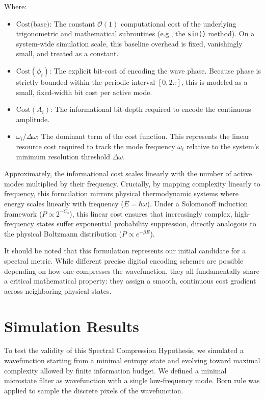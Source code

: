Where:
\begin{itemize}
    \item \textbf{$\text{Cost(base)}$}: The constant $\mathcal{O}(1)$ computational cost of the underlying trigonometric and mathematical subroutines (e.g., the \texttt{sin()} method). 
    On a system-wide simulation scale, this baseline overhead is fixed, vanishingly small, and treated as a constant.
    \item \textbf{$\text{Cost}(\phi_i)$}: The explicit bit-cost of encoding the wave phase. Because phase is strictly bounded within the periodic interval $[0, 2\pi]$, this is modeled as a small, 
    fixed-width bit cost per active mode.
    \item \textbf{$\text{Cost}(A_i)$}: The informational bit-depth required to encode the continuous amplitude.
    \item \textbf{$\omega_i / \Delta\omega$}: The dominant term of the cost function. This represents the linear resource cost required to track the mode frequency $\omega_i$ relative to the system's 
    minimum resolution threshold $\Delta\omega$.
\end{itemize}

Approximately, the informational cost scales linearly with the number of active modes multiplied by their frequency. Crucially, by mapping complexity linearly to frequency, 
this formulation mirrors physical thermodynamic systems where energy scales linearly with frequency ($E = \hbar\omega$). Under a Solomonoff induction framework ($P \propto 2^{-C_s}$), 
this linear cost ensures that increasingly complex, high-frequency states suffer exponential probability suppression, directly analogous to the physical Boltzmann distribution ($P \propto e^{-\beta E}$).

It should be noted that this formulation represents our initial candidate for a spectral metric. 
While different precise digital encoding schemes are possible depending on how one compresses the wavefunction, they all fundamentally share a critical mathematical property: 
they assign a smooth, continuous cost gradient across neighboring physical states.


\section*{Simulation Results}

To test the validity of this Spectral Compression Hypothesis, we simulated a wavefunction starting from a minimal entropy state and evolving toward maximal complexity allowed by finite information budget.
We defined a minimal microstate filter as wavefunction with a single low-frequency mode. Born rule was applied to sample the discrete pixels of the wavefunction.

